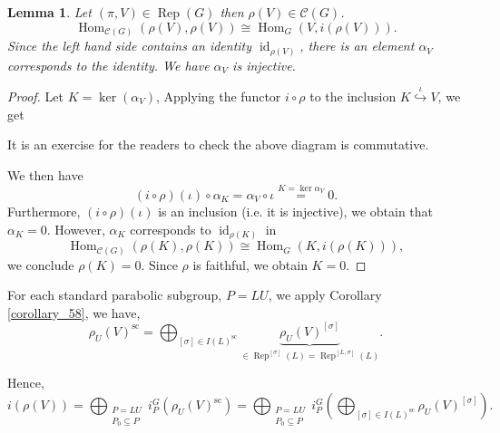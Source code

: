 \documentclass[8pt]{article}
\newtheorem{lemma}{Lemma}[section]
\DeclareMathOperator{\Rep}{Rep}
\DeclareMathOperator{\Hom}{Hom}
\DeclareMathOperator{\id}{id}
\DeclareMathOperator{\supcus}{sc}
\newcommand{\cat}{\mathscr{C}}
\begin{document}
\begin{lemma}
  Let $(\pi,V)\in\Rep(G)$ then $\rho(V)\in\cat(G)$. 
\begin{equation*}
  \Hom_{\cat(G)}(\rho(V),\rho(V)) \cong\Hom_G(V,i(\rho(V))).
\end{equation*}
Since the left hand side contains an identity $\id_{\rho(V)}$, there is an element $\alpha_V$ corresponds to the identity.
We have $\alpha_V$ is injective.
\label{lemma_87}
\end{lemma}

\begin{proof}
  Let $K = \ker(\alpha_V)$, Applying the functor $i\circ\rho$ to the inclusion $K\stackrel{\iota}{\hookrightarrow} V$, we get 
  \begin{center}
  \end{center}
  It is an exercise for the readers to check the above diagram is commutative.
  \par We then have 
  \begin{equation*}
    (i\circ\rho)(\iota)\circ\alpha_K = \alpha_V\circ\iota\stackrel{K = \ker\alpha_V}{=}0.
  \end{equation*}
  Furthermore, $(i\circ\rho)(\iota)$ is an inclusion (i.e. it is injective), we obtain that $\alpha_K=0$. However, $\alpha_K$ corresponds to $\id_{\rho(K)}$ in 
  \begin{equation*}
    \Hom_{\cat(G)}(\rho(K),\rho(K)) \cong\Hom_G(K,i(\rho(K))),
  \end{equation*}
  we conclude $\rho(K)=0$. Since $\rho$ is faithful, we obtain $K=0$.
\end{proof}

For each standard parabolic subgroup, $P=LU$, we apply Corollary \ref{corollary_58}, we have,
\begin{equation*}
  \rho_U(V)^{\supcus} = \bigoplus_{[\sigma]\in I(L)^{\supcus}}\underbrace{\rho_U(V)^{[\sigma]}}_{\in\Rep^{[\sigma]}(L) = \Rep^{[L,\sigma]}(L)}.
\end{equation*}

Hence,
\begin{equation*}
  i(\rho(V)) = \bigoplus_{\substack{P=LU\\ P_0\subseteq P}}i_P^G(\rho_U(V)^{\supcus}) = \bigoplus_{\substack{P=LU\\ P_0\subseteq P}}i_P^G\left(\bigoplus_{[\sigma]\in I(L)^{\supcus}}\rho_U(V)^{[\sigma]}\right).
\end{equation*}
\end{document}
